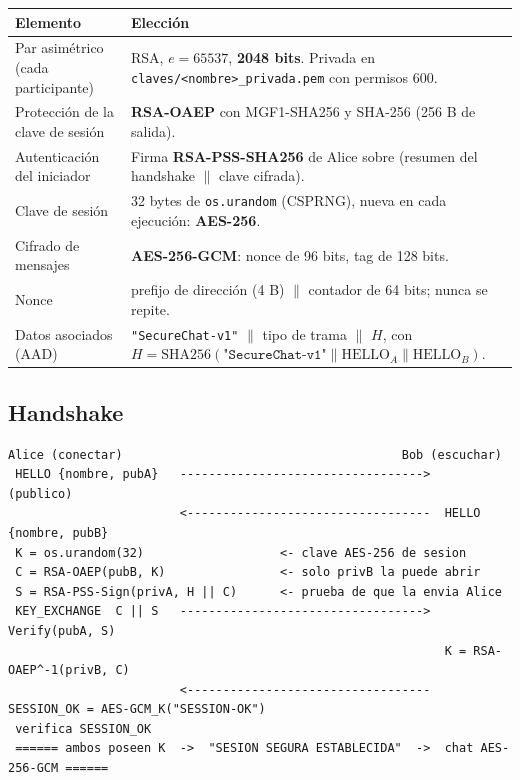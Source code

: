 \documentclass[11pt,a4paper]{article}
\begin{document}
\begin{center}
\begin{tabularx}{\linewidth}{@{}lX@{}}
\toprule
\textbf{Elemento} & \textbf{Elección} \\ \midrule
Par asimétrico (cada participante) & RSA, $e=65537$, \textbf{2048 bits}. Privada en \texttt{claves/<nombre>\_privada.pem} con permisos 600. \\
Protección de la clave de sesión & \textbf{RSA-OAEP} con MGF1-SHA256 y SHA-256 (256 B de salida). \\
Autenticación del iniciador & Firma \textbf{RSA-PSS-SHA256} de Alice sobre (resumen del handshake $\|$ clave cifrada). \\
Clave de sesión & 32 bytes de \texttt{os.urandom} (CSPRNG), nueva en cada ejecución: \textbf{AES-256}. \\
Cifrado de mensajes & \textbf{AES-256-GCM}: nonce de 96 bits, tag de 128 bits. \\
Nonce & prefijo de dirección (4 B) $\|$ contador de 64 bits; nunca se repite. \\
Datos asociados (AAD) & \texttt{"SecureChat-v1"} $\|$ tipo de trama $\|$ $H$, con $H=\mathrm{SHA256}(\texttt{"SecureChat-v1"}\|\mathrm{HELLO}_A\|\mathrm{HELLO}_B)$. \\
\bottomrule
\end{tabularx}
\end{center}

\subsection{Handshake}

\begin{lstlisting}[basicstyle=\ttfamily\scriptsize,columns=fullflexible,keepspaces=true]
 Alice (conectar)                                       Bob (escuchar)
 HELLO {nombre, pubA}   ---------------------------------->   (publico)
                        <----------------------------------  HELLO {nombre, pubB}
 K = os.urandom(32)                   <- clave AES-256 de sesion
 C = RSA-OAEP(pubB, K)                <- solo privB la puede abrir
 S = RSA-PSS-Sign(privA, H || C)      <- prueba de que la envia Alice
 KEY_EXCHANGE  C || S   ---------------------------------->  Verify(pubA, S)
                                                             K = RSA-OAEP^-1(privB, C)
                        <----------------------------------  SESSION_OK = AES-GCM_K("SESSION-OK")
 verifica SESSION_OK
 ====== ambos poseen K  ->  "SESION SEGURA ESTABLECIDA"  ->  chat AES-256-GCM ======
\end{lstlisting}
\end{document}
